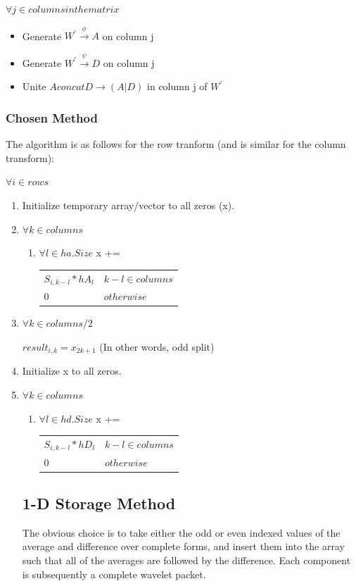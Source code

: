 \documentclass[11pt]{article}
\begin{document}
$\forall j  \in columns in the matrix$
\begin{itemize}
\item Generate $W^\prime \stackrel{\phi}{\to} A$ on column j
\item Generate $W^\prime \stackrel{\psi}{\to} D$ on column j
\item Unite $A concat D \to (A|D) $ in column j of $W^\prime $
\end{itemize}

\newpage
\subsubsection {Chosen Method}
The algorithm is as follows for the row tranform (and is similar for the column transform):  

$\forall i \in rows$
\begin{enumerate}
\item Initialize temporary array/vector to all zeros (x).
\item $\forall k \in columns $
\begin{enumerate}
\item $\forall l \in ha.Size $
x +=  \begin{tabular}{ll}
$S_{i,k-l} * hA_l$ & $k-l \in columns$ \\ 
$0$ & $otherwise$%
\end{tabular}
\end{enumerate}
\item $\forall k \in columns/2 $

$result_{i,k} = x_{2k+1} $  (In other words, odd split)

\item Initialize x to all zeros.
\item $\forall k \in columns $
\begin{enumerate}
\item $\forall l \in hd.Size $
x +=  \begin{tabular}{ll}
$S_{i,k-l} * hD_l$ & $k-l \in columns$ \\ 
$0$ & $otherwise$%
\end{tabular}
\end{enumerate}

\newpage
\subsection{1-D Storage Method}
The obvious choice is to take either the odd or even indexed values of the average and difference over complete forms, and insert them into the array such that all of the averages are followed by the difference.  Each component is subsequently a complete wavelet packet.  


\end{enumerate}
\end{document}
